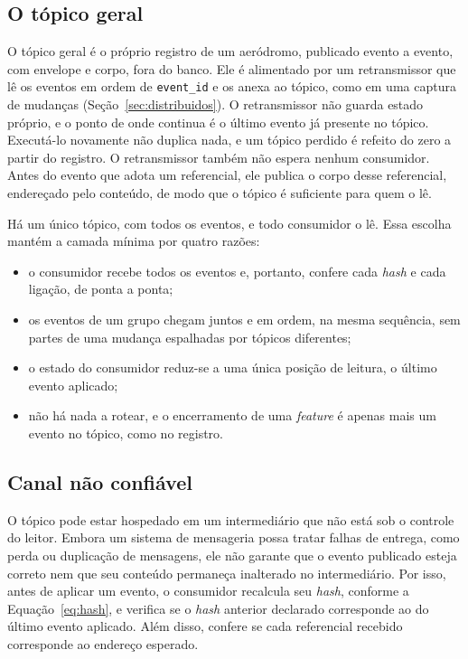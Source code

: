\subsection{O tópico geral}

O tópico geral é o próprio registro de um aeródromo, publicado evento a evento, com envelope e corpo, fora do banco. Ele é alimentado por um retransmissor que lê os eventos em ordem de \texttt{event\_id} e os anexa ao tópico, como em uma captura de mudanças (Seção~\ref{sec:distribuidos}). O retransmissor não guarda estado próprio, e o ponto de onde continua é o último evento já presente no tópico. Executá-lo novamente não duplica nada, e um tópico perdido é refeito do zero a partir do registro. O retransmissor também não espera nenhum consumidor. Antes do evento que adota um referencial, ele publica o corpo desse referencial, endereçado pelo conteúdo, de modo que o tópico é suficiente para quem o lê.

Há um único tópico, com todos os eventos, e todo consumidor o lê. Essa escolha mantém a camada mínima por quatro razões:
\begin{itemize}
    \item o consumidor recebe todos os eventos e, portanto, confere cada \textit{hash} e cada ligação, de ponta a ponta;
    \item os eventos de um grupo chegam juntos e em ordem, na mesma sequência, sem partes de uma mudança espalhadas por tópicos diferentes;
    \item o estado do consumidor reduz-se a uma única posição de leitura, o último evento aplicado;
    \item não há nada a rotear, e o encerramento de uma \textit{feature} é apenas mais um evento no tópico, como no registro.
\end{itemize}


\subsection{Canal não confiável}

O tópico pode estar hospedado em um intermediário que não está sob o
controle do leitor. Embora um sistema de mensageria possa tratar falhas de
entrega, como perda ou duplicação de mensagens, ele não garante que o evento
publicado esteja correto nem que seu conteúdo permaneça inalterado no
intermediário. Por isso, antes de aplicar um evento, o consumidor recalcula
seu \textit{hash}, conforme a Equação~\ref{eq:hash}, e verifica se o
\textit{hash} anterior declarado corresponde ao do último evento aplicado.
Além disso, confere se cada referencial recebido corresponde ao endereço
esperado.

